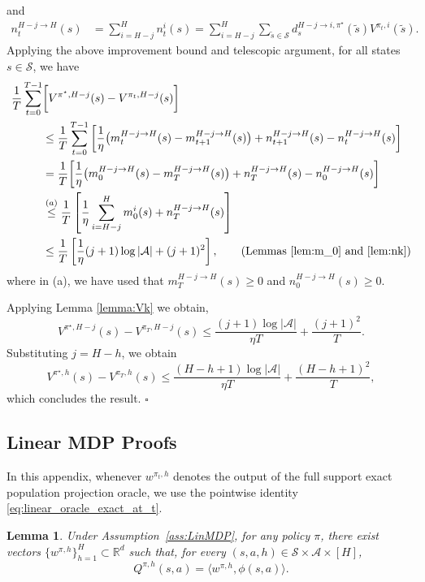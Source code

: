 \documentclass[11pt]{article}
\newtheorem{lem}{Lemma}
\begin{document}
and
\begin{align*} 
n_{t}^{H-j\to H} (s) & = \sum^H_{i=H-j} n^i_t (s) = \sum^H_{i=H-j} \sum_{\tilde{s} \in \mathcal{S}} d^{{H-j} \to i, \pi^\star}_s (\tilde{s})V^{\pi_t,i}(\tilde{s}).
\end{align*}
Applying the above improvement bound and telescopic argument, for all states $s \in \mathcal{S}$, we have  
\begin{align*}
\frac{1}{T}\sum^{T-1}_{t=0} & \bigg[ V^{\pi^\star,{H-j}}(s) - V^{\pi_t,{H-j}}(s)\bigg] \\
& \leq  \frac{1}{T} \sum^{T-1}_{t=0} 
 \bigg[ \frac{1}{\eta} \big( m_t^{H-j\to H} (s) -m_{t+1}^{H-j\to H} (s) \big) +  n_{t+1}^{H-j\to H} (s)-n_{t}^{H-j\to H}(s)\bigg] \\
 & = \frac{1}{T} \bigg[ \frac{1}{\eta} \big( m_0^{H-j\to H} (s) -m_T^{H-j\to H} (s) \big) + n_T^{H-j\to H} (s)-n_0^{H-j\to H}(s)\bigg] \\
 & \overset{(a)}{\leq} \frac{1}{T} \left[\frac{1}{\eta}  \sum^H_{i=H-j} {m}^{i}_0 (s)  + n_{T}^{H-j\to H} (s) \right]\\
&  \leq \frac{1}{T} \left[\frac{1}{\eta} (j+1) \log|\mathcal A| + (j+1)^2 \right],  \tag{\text{Lemmas \ref{lem:m_0} and \ref{lem:nk}}} 
\end{align*}
where in (a), we have used that $m_T^{H-j\to H} (s) \geq 0$ and $n_0^{H-j\to H}(s) \geq 0$.

Applying Lemma \ref{lemma:Vk} we obtain,
\begin{equation} \nonumber
V^{\pi^\star,{H-j}}(s) - V^{\pi_T,{H-j}}(s) \leq \frac{(j+1)\log|\mathcal A|}{\eta T} +  \frac{(j+1)^2} {T}.
\end{equation}
Substituting $j=H-h$, we obtain
\begin{equation} \nonumber
   V^{\pi^\star,h}(s) - V^{\pi_T,h}(s) \leq \frac{(H-h+1)\log|\mathcal A|}{\eta T} +  \frac{(H-h+1)^2} {T}  ,
\end{equation}
which concludes the result.
\hfill
$\square$

\subsection{Linear MDP Proofs} \label{app:Linlem}
In this appendix, whenever $w^{\pi_t,h}$ denotes the output of the full support
exact population projection oracle, we use the pointwise identity
\eqref{eq:linear_oracle_exact_at_t}.

\begin{lem}{\citep{jin2020provably}} \label{lem:Qlin}
Under Assumption~\ref{ass:LinMDP}, for any policy $\pi$, there exist vectors
$\{w^{\pi,h}\}_{h=1}^H\subset\mathbb R^d$ such that, for every
$(s,a,h)\in\mathcal S\times\mathcal A\times[H]$,
\[
    Q^{\pi,h}(s,a)
    =
    \langle w^{\pi,h},\phi(s,a)\rangle .
\]
\end{lem}
\end{document}
